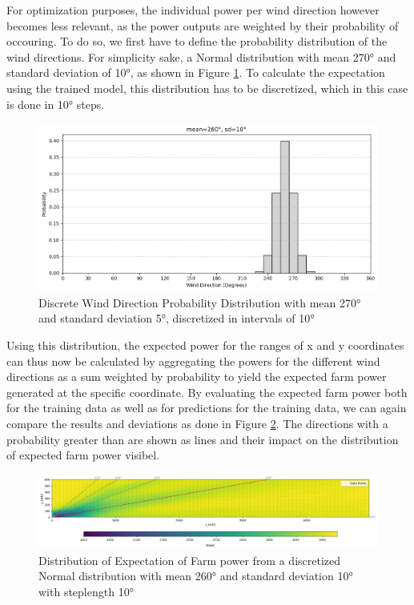For optimization purposes, the individual power per wind direction however becomes less relevant, as the power outputs are weighted by their probability of occouring. 
To do so, we first have to define the probability distribution of the wind directions. For simplicity sake, a Normal distribution with mean 270° and standard deviation of 10°, as shown in Figure \ref{fig:wind_dist_opti}. To calculate the expectation using the trained model, this distribution has to be discretized, which in this case is done in 10° steps. 


\begin{figure}[h] 
	\centering
	\includegraphics[width=1\textwidth]{figures/optimization/wind_dist_opti.png} 
	\caption{Discrete Wind Direction Probability Distribution with mean 270° and standard deviation 5°, discretized in intervals of 10° }
	\label{fig:wind_dist_opti}
\end{figure}


Using this distribution, the expected power for the ranges of x and y coordinates can thus now be calculated by aggregating the powers for the different wind directions as a sum weighted by probability to yield the expected farm power generated at the specific coordinate. By evaluating the expected farm power both for the training data as well as for predictions for the training data, we can again compare the results and deviations as done in Figure \ref{fig:prob_expectation}. The directions with a probability greater than are shown as lines and their impact on the distribution of expected farm power visibel.

\begin{figure}[h] 
	\centering
	\includegraphics[width=1\textwidth]{figures/optimization/prob_expectation.png} 
	\caption{Distribution of Expectation of Farm power from a discretized Normal distribution with mean 260° and standard deviation 10° with steplength 10°}
	\label{fig:prob_expectation}
\end{figure}

